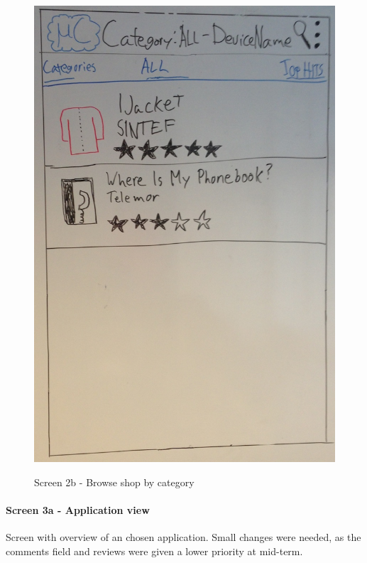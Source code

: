 \begin{figure}[H]
\centering
\includegraphics[scale=0.2]{images/Design_guide/Screen2b.png}
\label{fig:2b}
\caption{Screen 2b - Browse shop by category}
\end{figure}


\paragraph{Screen 3a - Application view}
Screen with overview of an chosen application. Small changes were needed, as the comments field and reviews were given a lower priority at mid-term.

